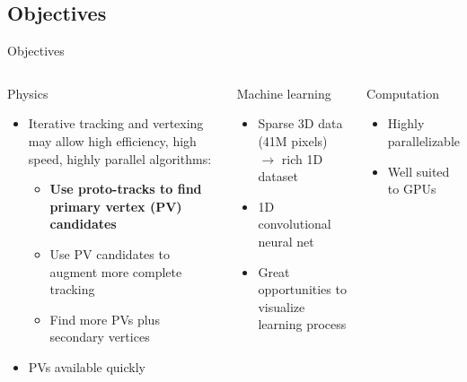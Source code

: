 \subsection{Objectives}
\begin{frame}{Objectives}
\begin{columns}[c]
    \begin{block}{Physics}
    \begin{itemize}
        \item Iterative tracking and vertexing may allow high efficiency, high speed, highly parallel algorithms:
        \begin{itemize}
            \item \textbf{Use proto-tracks to find primary vertex (PV) candidates}
            \item Use PV candidates to augment more complete tracking
            \item Find more PVs plus secondary vertices
        \end{itemize}
        \item PVs available quickly
    \end{itemize}
    \end{block}
    \begin{block}{Machine learning}
    \begin{itemize}
        \item Sparse 3D data (41M pixels) $\to$ rich 1D dataset
        \item 1D convolutional neural net
        \item Great opportunities to visualize learning process
    \end{itemize}
    \end{block}

    \begin{block}{Computation}
    \begin{itemize}
        \item Highly parallelizable
        \item Well suited to GPUs
    \end{itemize}
    \end{block}
\end{columns}


\end{frame}

